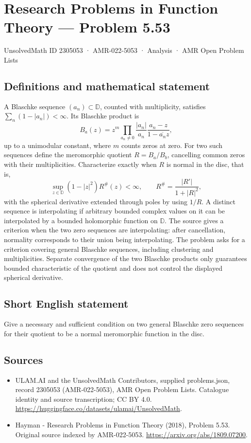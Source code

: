 \documentclass[11pt,a4paper]{article}
\begin{document}
\section*{Research Problems in Function Theory — Problem 5.53}\label{2305053}
{\small UnsolvedMath ID 2305053 · AMR-022-5053 · Analysis · AMR Open Problem Lists}
\subsection{Definitions and mathematical statement}
A Blaschke sequence $(a_n)\subset\mathbb D$, counted with multiplicity, satisfies $\sum_n(1-|a_n|)<\infty$. Its Blaschke product is
\[
B_a(z)=z^m\prod_{a_n\ne0}\frac{|a_n|}{a_n}\frac{a_n-z}{1-\overline{a_n}z},
\]
up to a unimodular constant, where $m$ counts zeros at zero. For two such sequences define the meromorphic quotient $R=B_a/B_b$, cancelling common zeros with their multiplicities.
Characterize exactly when $R$ is normal in the disc, that is,
\[
\sup_{z\in\mathbb D}(1-|z|^2)R^{\#}(z)<\infty,
\qquad R^{\#}=\frac{|R'|}{1+|R|^2},
\]
with the spherical derivative extended through poles by using $1/R$.
A distinct sequence is interpolating if arbitrary bounded complex values on it can be interpolated by a bounded holomorphic function on $\mathbb D$. The source gives a criterion when the two zero sequences are interpolating: after cancellation, normality corresponds to their union being interpolating. The problem asks for a criterion covering general Blaschke sequences, including clustering and multiplicities. Separate convergence of the two Blaschke products only guarantees bounded characteristic of the quotient and does not control the displayed spherical derivative.
\subsection{Short English statement}
Give a necessary and sufficient condition on two general Blaschke zero sequences for their quotient to be a normal meromorphic function in the disc.
\subsection{Sources}
\begin{itemize}
\item[S1] ULAM.AI and the UnsolvedMath Contributors, supplied problems.json, record 2305053 (AMR-022-5053), AMR Open Problem Lists. Catalogue identity and source transcription; CC BY 4.0.
\url{https://huggingface.co/datasets/ulamai/UnsolvedMath}.
\item[S2] Hayman - Research Problems in Function Theory (2018), Problem 5.53. Original source indexed by AMR-022-5053.
\url{https://arxiv.org/abs/1809.07200}.
\end{itemize}
\end{document}
